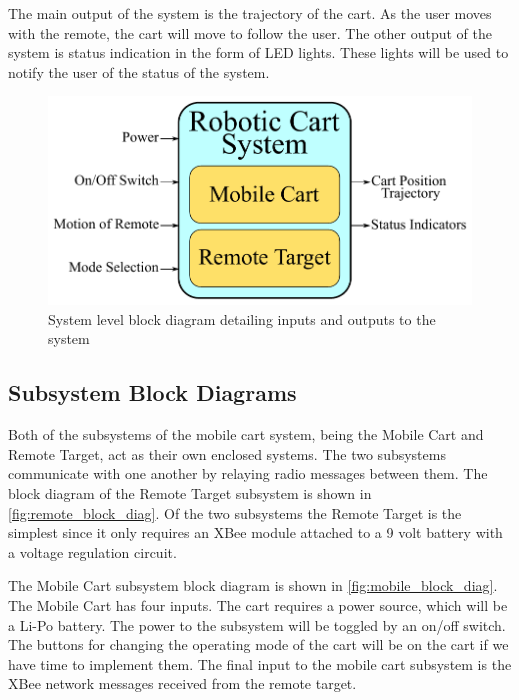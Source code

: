 \documentclass[letterpaper,12pt]{article}   %
\begin{document}
\vspace*{12pt}
\noindent
The main output of the system is the trajectory of the cart. As the user moves with the remote, the cart will move to follow the user. The other output of the system is status indication in the form of LED lights. These lights will be used to notify the user of the status of the system.

\begin{figure}[!h]
    \centering
    \includegraphics[scale=0.9]{figs/system_block_diagram_2}
    \caption{System level block diagram detailing inputs and outputs to the system}
	\label{fig:sys_block_diag}
\end{figure}

\subsection{Subsystem Block Diagrams}
Both of the subsystems of the mobile cart system, being the Mobile Cart and Remote Target, act as their own enclosed systems. The two subsystems communicate with one another by relaying radio messages between them. The block diagram of the Remote Target subsystem is shown in \autoref{fig:remote_block_diag}. Of the two subsystems the Remote Target is the simplest since it only requires an XBee module attached to a 9 volt battery with a voltage regulation circuit.

\vspace*{12pt}
\noindent
The Mobile Cart subsystem block diagram is shown in \autoref{fig:mobile_block_diag}. The Mobile Cart has four inputs. The cart requires a power source, which will be a Li-Po battery. The power to the subsystem will be toggled by an on/off switch. The buttons for changing the operating mode of the cart will be on the cart if we have time to implement them. The final input to the mobile cart subsystem is the XBee network messages received from the remote target.
\end{document}
